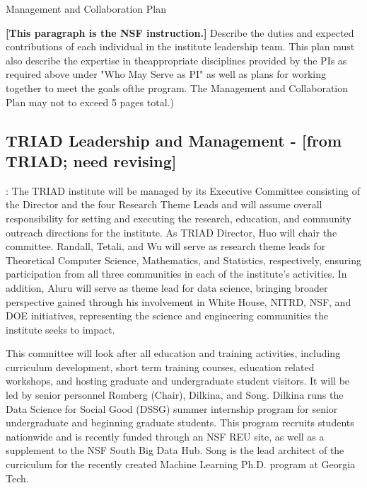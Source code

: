 \documentclass[12pt]{article}
\newcommand{\shrink}{\def\baselinestretch{0.90}\large\normalsize}
\begin{document}


\clearpage
\pagestyle{plain}
\normalbaselineskip=10.0pt



\begin{center}
  Management and Collaboration Plan
\end{center}

{\bf [This paragraph is the NSF instruction.]}
Describe the duties and expected contributions of each individual in the institute leadership team. This plan must also describe the expertise in theappropriate disciplines provided by the PIs as required above under "Who May Serve as PI" as well as plans for working together to meet the goals ofthe program. The Management and Collaboration Plan may not to exceed 5 pages total.)


\subsection{TRIAD Leadership and Management - [from TRIAD; need revising]}
\label{sec:leadership2}

: The TRIAD institute will be managed by its Executive Committee consisting of the Director and the four Research Theme Leads and will assume overall responsibility for setting and executing the research, education, and community outreach directions for the institute.
As TRIAD Director, Huo will chair the committee.
Randall, Tetali, and Wu will serve as research theme leads for Theoretical Computer Science, Mathematics, and Statistics, respectively, ensuring participation from all three communities in each of the institute's activities. In addition, Aluru will serve as theme lead for data science, bringing broader perspective gained through his involvement in White House, NITRD, NSF, and DOE initiatives, representing the science and engineering communities the institute seeks to impact.

 This committee will look after all education and training activities, including curriculum development, short term training courses, education related workshops, and hosting graduate and undergraduate student visitors. It will be led by senior personnel Romberg (Chair), Dilkina, and Song. Dilkina runs the Data Science for Social Good (DSSG) summer internship program for senior undergraduate and beginning graduate students. This program recruits students nationwide and is recently funded through an NSF REU site, as well as a supplement to the NSF South Big Data Hub. Song is the lead architect of the curriculum for the recently created Machine Learning Ph.D. program at Georgia Tech.
\end{document}
